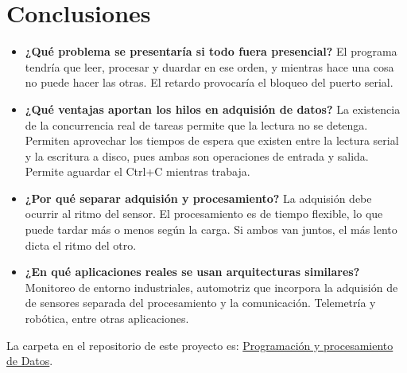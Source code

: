 \documentclass{assignment}
\begin{document}
	\section*{Conclusiones}
	\begin{itemize}
		\item {\bf ¿Qué problema se presentaría si todo fuera presencial?} El programa tendría que leer, procesar y duardar en ese orden, y mientras hace una cosa no puede hacer las otras. El retardo provocaría el bloqueo del puerto serial.
		\item {\bf ¿Qué ventajas aportan los hilos en adquisión de datos?} La existencia de la concurrencia real de tareas permite que la lectura no se detenga. Permiten aprovechar los tiempos de espera que existen entre la lectura serial y la escritura a disco, pues ambas son operaciones de entrada y salida. Permite aguardar el Ctrl+C mientras trabaja.
		\item {\bf ¿Por qué separar adquisión y procesamiento?} La  adquisión debe ocurrir al ritmo del sensor. El procesamiento es de tiempo flexible, lo que puede tardar más o menos según la carga. Si ambos van juntos, el más lento dicta el ritmo del otro.
		\item {\bf ¿En qué aplicaciones reales se usan arquitecturas similares?} Monitoreo de entorno industriales, automotriz que incorpora la adquisión de de sensores separada del procesamiento y la comunicación. Telemetría y robótica, entre otras aplicaciones.
	\end{itemize}
	La carpeta en el repositorio de este proyecto es: \href{https://github.com/clivan/Programacion_y_Procesamiento_de_Datos_Infotec/5A}{Programación y procesamiento de Datos}.	
\end{document}
